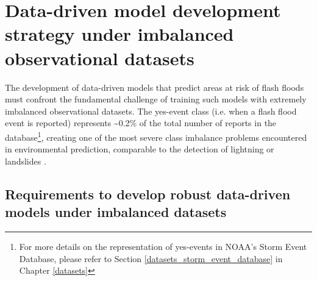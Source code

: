 \begin{figure}[htbp]
\label{fig:curve_roc_pr_examples}
\end{figure}


\section{Data-driven model development strategy 
under imbalanced observational datasets}
\label{integrated_experimental_strategy_model_development_imbalanced_data}

The development of data-driven models that predict areas at risk of flash floods must confront the fundamental challenge of training such models with extremely imbalanced observational datasets. The yes-event class (i.e. when a flash flood event is reported) represents \sim0.2\% of the total number of reports in the database\footnote{For more details on the representation of yes-events in NOAA's Storm Event Database, please refer to Section \ref{datasets_storm_event_database} in Chapter \ref{datasets}}, creating one of the most severe class imbalance problems encountered in environmental prediction, comparable to the detection of lightning \citep{Cavaiola_2024} or landslides \citep{Xu_2022, Agrawal_2017, Zhang_2022, Gupta_2023}. 

\subsection{Requirements to develop robust data-driven models under imbalanced datasets}

